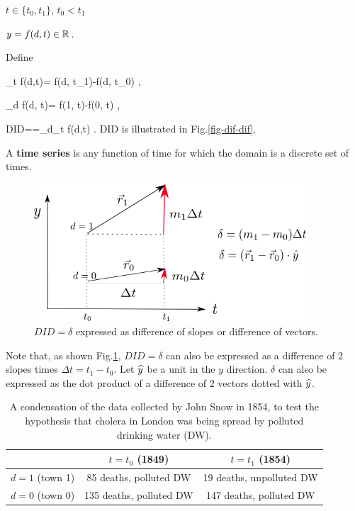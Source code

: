 $t\in \{t_0, t_1\}$, $t_0< t_1$

$y=f(d,t)\in { \mathbb{R}}$.

Define

\beq
\Delta_t f(d,t)= f(d, t_1)-f(d, t_0)
\;,
\eeq

\beq
\Delta_d f(d, t)= f(1, t)-f(0, t)
\;,
\eeq

\beq
DID=\delta=\Delta_d\Delta_t f(d,t)
\;.
\eeq
DID is illustrated in
 Fig.\ref{fig-dif-dif}. 


A {\bf time series} 
is  any function of time
for which the domain is a discrete set of times.




\begin{figure}[h!]
\centering
\includegraphics[width=4in]{did/did-3-prod}
\caption{$DID=\delta$ expressed as 
difference of slopes or 
difference of vectors.} 
\label{fig-did-3-prod}
\end{figure}

Note that,
as shown Fig.\ref{fig-did-3-prod},
$DID=\delta$ can also be expressed
as a difference of 2 slopes
times $\Delta t = t_1-t_0$.
Let
$\widehat{y}$ be a unit
in the $y$ direction.
$\delta$ can also be expressed
as the dot product of a difference of 2 vectors
dotted with $\widehat{y}$.


\begin{table}[h!]
\centering
{\renewcommand{\arraystretch}{1.4}
\begin{tabular}{|c|c|c|}
\hline 
\rowcolor[HTML]{ECF4FF} 
 & $t=t_0 $ (1849) & $t=t_1$ (1854) \\ 
\hline
$d=1 $ (town 1)\cellcolor[HTML]{ECF4FF}
&85 deaths, polluted DW&19 deaths, unpolluted DW\\
\hline 
$d=0 $ (town 0)\cellcolor[HTML]{ECF4FF} 
&135 deaths, polluted DW& 147 deaths, polluted DW\\ 
\end{tabular}
}
\caption{A condensation of the data
collected by 
John Snow in 1854,
to test the hypothesis
that cholera in London was being spread by
polluted drinking water (DW).}
\label{tab-john-snow}
\end{table}


